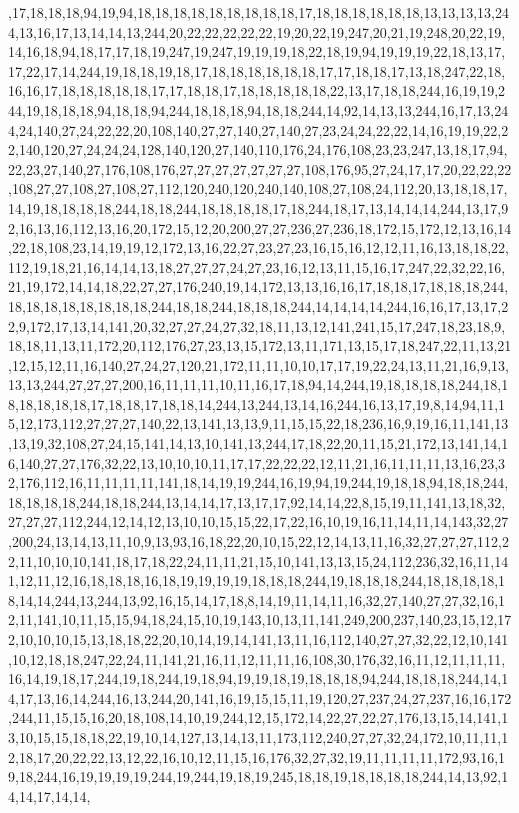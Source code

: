 ,17,18,18,18,94,19,94,18,18,18,18,18,18,18,18,18,17,18,18,18,18,18,18,13,13,13,13,244,13,16,17,13,14,14,13,244,20,22,22,22,22,22,19,20,22,19,247,20,21,19,248,20,22,19,14,16,18,94,18,17,17,18,19,247,19,247,19,19,19,18,22,18,19,94,19,19,19,22,18,13,17,17,22,17,14,244,19,18,18,19,18,17,18,18,18,18,18,18,17,17,18,18,17,13,18,247,22,18,16,16,17,18,18,18,18,18,17,17,18,18,17,18,18,18,18,18,22,13,17,18,18,244,16,19,19,244,19,18,18,18,94,18,18,94,244,18,18,18,94,18,18,244,14,92,14,13,13,244,16,17,13,244,24,140,27,24,22,22,20,108,140,27,27,140,27,140,27,23,24,24,22,22,14,16,19,19,22,22,140,120,27,24,24,24,128,140,120,27,140,110,176,24,176,108,23,23,247,13,18,17,94,22,23,27,140,27,176,108,176,27,27,27,27,27,27,27,108,176,95,27,24,17,17,20,22,22,22,108,27,27,108,27,108,27,112,120,240,120,240,140,108,27,108,24,112,20,13,18,18,17,14,19,18,18,18,18,244,18,18,244,18,18,18,18,17,18,244,18,17,13,14,14,14,244,13,17,92,16,13,16,112,13,16,20,172,15,12,20,200,27,27,236,27,236,18,172,15,172,12,13,16,14,22,18,108,23,14,19,19,12,172,13,16,22,27,23,27,23,16,15,16,12,12,11,16,13,18,18,22,112,19,18,21,16,14,14,13,18,27,27,27,24,27,23,16,12,13,11,15,16,17,247,22,32,22,16,21,19,172,14,14,18,22,27,27,176,240,19,14,172,13,13,16,16,17,18,18,17,18,18,18,244,18,18,18,18,18,18,18,18,244,18,18,244,18,18,18,244,14,14,14,14,244,16,16,17,13,17,22,9,172,17,13,14,141,20,32,27,27,24,27,32,18,11,13,12,141,241,15,17,247,18,23,18,9,18,18,11,13,11,172,20,112,176,27,23,13,15,172,13,11,171,13,15,17,18,247,22,11,13,21,12,15,12,11,16,140,27,24,27,120,21,172,11,11,10,10,17,17,19,22,24,13,11,21,16,9,13,13,13,244,27,27,27,200,16,11,11,11,10,11,16,17,18,94,14,244,19,18,18,18,18,244,18,18,18,18,18,18,17,18,18,17,18,18,14,244,13,244,13,14,16,244,16,13,17,19,8,14,94,11,15,12,173,112,27,27,27,140,22,13,141,13,13,9,11,15,15,22,18,236,16,9,19,16,11,141,13,13,19,32,108,27,24,15,141,14,13,10,141,13,244,17,18,22,20,11,15,21,172,13,141,14,16,140,27,27,176,32,22,13,10,10,10,11,17,17,22,22,22,12,11,21,16,11,11,11,13,16,23,32,176,112,16,11,11,11,11,141,18,14,19,19,244,16,19,94,19,244,19,18,18,94,18,18,244,18,18,18,18,244,18,18,244,13,14,14,17,13,17,17,92,14,14,22,8,15,19,11,141,13,18,32,27,27,27,112,244,12,14,12,13,10,10,15,15,22,17,22,16,10,19,16,11,14,11,14,143,32,27,200,24,13,14,13,11,10,9,13,93,16,18,22,20,10,15,22,12,14,13,11,16,32,27,27,27,112,22,11,10,10,10,141,18,17,18,22,24,11,11,21,15,10,141,13,13,15,24,112,236,32,16,11,141,12,11,12,16,18,18,18,16,18,19,19,19,19,18,18,18,244,19,18,18,18,244,18,18,18,18,18,14,14,244,13,244,13,92,16,15,14,17,18,8,14,19,11,14,11,16,32,27,140,27,27,32,16,12,11,141,10,11,15,15,94,18,24,15,10,19,143,10,13,11,141,249,200,237,140,23,15,12,172,10,10,10,15,13,18,18,22,20,10,14,19,14,141,13,11,16,112,140,27,27,32,22,12,10,141,10,12,18,18,247,22,24,11,141,21,16,11,12,11,11,16,108,30,176,32,16,11,12,11,11,11,16,14,19,18,17,244,19,18,244,19,18,94,19,19,18,19,18,18,18,94,244,18,18,18,244,14,14,17,13,16,14,244,16,13,244,20,141,16,19,15,15,11,19,120,27,237,24,27,237,16,16,172,244,11,15,15,16,20,18,108,14,10,19,244,12,15,172,14,22,27,22,27,176,13,15,14,141,13,10,15,15,18,18,22,19,10,14,127,13,14,13,11,173,112,240,27,27,32,24,172,10,11,11,12,18,17,20,22,22,13,12,22,16,10,12,11,15,16,176,32,27,32,19,11,11,11,11,172,93,16,19,18,244,16,19,19,19,19,244,19,244,19,18,19,245,18,18,19,18,18,18,18,244,14,13,92,14,14,17,14,14,